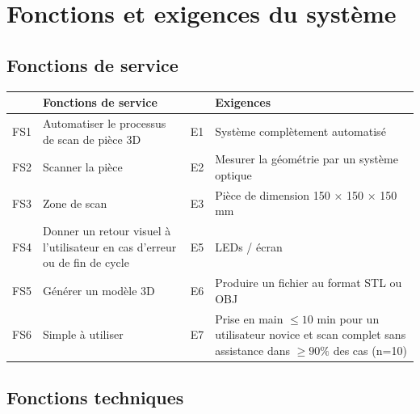 \documentclass[11pt,a4paper]{report}
\begin{document}

\chapter{Fonctions et exigences du système}

\section{Fonctions de service}

\begin{center}
\begin{tabularx}{\textwidth}{c X c X}
\toprule
 & \textbf{Fonctions de service} &  & \textbf{Exigences} \\
\midrule
FS1 & Automatiser le processus de scan de pièce 3D & E1 & Système complètement automatisé \\
\midrule
FS2 & Scanner la pièce & E2 & Mesurer la géométrie par un système optique \\
\midrule
FS3 & Zone de scan & E3 & Pièce de dimension 150 × 150 × 150 mm \\
\midrule
FS4 & Donner un retour visuel à l’utilisateur en cas d’erreur ou de fin de cycle & E5 & LEDs / écran \\
\midrule
FS5 & Générer un modèle 3D & E6 & Produire un fichier au format STL ou OBJ \\
\midrule
FS6 & Simple à utiliser & E7 & Prise en main $\leq 10$ min pour un utilisateur novice et scan complet sans assistance dans $\geq 90\%$ des cas (n=10) \\
\bottomrule
\end{tabularx}
\end{center}

\section{Fonctions techniques}
\end{document}
